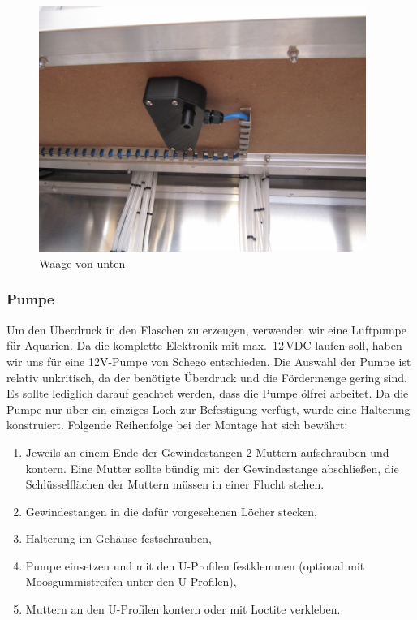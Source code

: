 \documentclass[a4paper]{scrartcl}
\begin{document}
\begin{figure}
  \centering
  \includegraphics[height=8cm]{pics/scale_bottom.JPG}
  \caption{Waage von unten}
\end{figure}
  
\subsubsection{Pumpe}
Um den Überdruck in den Flaschen zu erzeugen, verwenden wir eine Luftpumpe für Aquarien. Da die komplette Elektronik mit max.~12\,VDC laufen soll, haben wir uns für eine 12V-Pumpe von Schego entschieden. Die Auswahl der Pumpe ist relativ unkritisch, da der benötigte Überdruck und die Fördermenge gering sind. Es sollte lediglich darauf geachtet werden, dass die Pumpe ölfrei arbeitet. Da die Pumpe nur über ein einziges Loch zur Befestigung verfügt, wurde eine Halterung konstruiert. Folgende Reihenfolge bei der Montage hat sich bewährt:

\begin{enumerate}
  \item Jeweils an einem Ende der Gewindestangen 2 Muttern aufschrauben und kontern. Eine Mutter sollte bündig mit der Gewindestange abschließen, die Schlüsselflächen der Muttern müssen in einer Flucht stehen.
  \item Gewindestangen in die dafür vorgesehenen Löcher stecken,
  \item Halterung im Gehäuse festschrauben,
  \item Pumpe einsetzen und mit den U-Profilen festklemmen (optional mit Moosgummistreifen unter den U-Profilen),
  \item Muttern an den U-Profilen kontern oder mit Loctite verkleben.
\end{enumerate}
\end{document}

